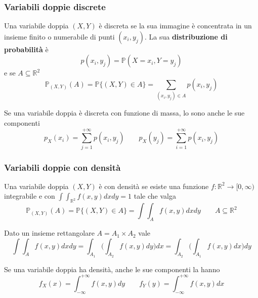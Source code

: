 \subsubsection{Variabili doppie discrete}
Una variabile doppia $(X,Y)$ è discreta se la sua immagine è concentrata in un insieme finito o numerabile di punti $(x_i, y_j)$. La sua \textbf{distribuzione di probabilità} è
\begin{equation}
	p(x_i,y_j) = \mathbb{P}(X=x_i, Y=y_j)
\end{equation}
e se $A\subseteq \mathbb{R}^2$
\begin{equation}
	\mathbb{P}_{(X,Y)}(A) = \mathbb{P}\{(X,Y) \in A\} = \sum_{(x_i, y_j) \in A}p(x_i, y_j)
\end{equation}

\begin{proposition}
	Se una variabile doppia è discreta con funzione di massa, lo sono anche le sue componenti
	\begin{equation}
		p_X(x_i) = \sum_{j=1}^{+\infty} p(x_i,y_j) \quad\quad p_X(y_j) = \sum_{i=1}^{+\infty} p(x_i,y_j)
	\end{equation}
\end{proposition}
\subsubsection{Variabili doppie con densità}
Una variabile doppia $(X,Y)$ è con densità se esiste una funzione $f : \mathbb{R}^2 \to [0,\infty)$ integrabile e con $\int\int_{\mathbb{R}^2}f(x,y)dxdy=1$ tale che valga
\begin{equation}
	\mathbb{P}_{(X,Y)}(A) = \mathbb{P}\{(X,Y) \in A\} = \int\int_A f(x,y) dxdy \quad\quad A \subseteq \mathbb{R}^2
\end{equation}

\begin{theorem}
	Dato un insieme rettangolare $A = A_1 \times A_2$ vale
	\begin{equation}
		\int\int_A f(x,y)dxdy = \int_{A_1} \bigg(\int_{A_2} f(x,y)dy\bigg)dx =  \int_{A_2} \bigg(\int_{A_1} f(x,y)dx\bigg)dy 
	\end{equation}
\end{theorem}

\begin{proposition}
	Se una variabile doppia ha densità, anche le sue componenti la hanno
	\begin{equation}
		f_X(x) = \int_{-\infty}^{+\infty}f(x,y)dy \quad\quad f_Y(y) = \int_{-\infty}^{+\infty}f(x,y)dx
	\end{equation}
\end{proposition}


